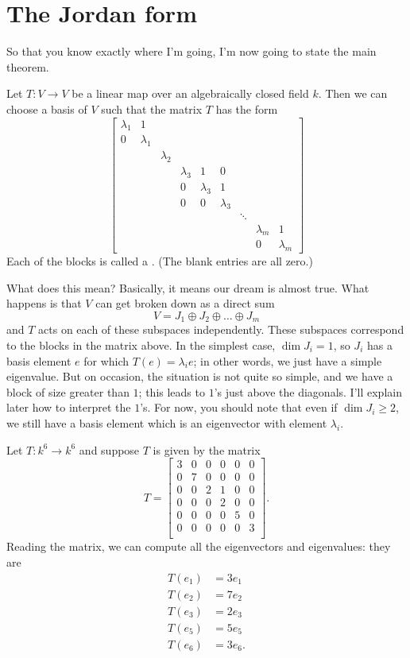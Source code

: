 \section{The Jordan form}
So that you know exactly where I'm going, I'm now going to state the main theorem.
\begin{theorem}
	Let $T : V \to V$ be a linear map over an algebraically closed field $k$.
	Then we can choose a basis of $V$ such that the matrix $T$ has the form
	\[
	\begin{bmatrix}
		\lambda_1 & 1 \\
		0 & \lambda_1 \\
		&& \lambda_2 \\
		&&& \lambda_3 & 1 & 0 \\
		&&& 0 & \lambda_3 & 1 \\
		&&& 0 & 0 & \lambda_3 \\
		&&&&&& \ddots \\
		&&&&&&& \lambda_m & 1 \\
		&&&&&&& 0 & \lambda_m
	\end{bmatrix}
	\]
	Each of the blocks is called a .
	(The blank entries are all zero.)
\end{theorem}
What does this mean?
Basically, it means our dream is almost true.
What happens is that $V$ can get broken down as a direct sum
\[ V = J_1 \oplus J_2 \oplus \dots \oplus J_m \]
and $T$ acts on each of these subspaces independently.
These subspaces correspond to the blocks in the matrix above.
In the simplest case, $\dim J_i = 1$, so $J_i$ has a basis element $e$ for which $T(e) = \lambda_i e$;
in other words, we just have a simple eigenvalue.
But on occasion, the situation is not quite so simple, and we have a block of size greater than $1$;
this leads to $1$'s just above the diagonals.
I'll explain later how to interpret the $1$'s.
For now, you should note that even if $\dim J_i \ge 2$, we still have a basis element
which is an eigenvector with element $\lambda_i$.

\begin{example}
	Let $T : k^6 \to k^6$ and suppose $T$ is given by the matrix
	\[ 
		T = \begin{bmatrix}
			3 & 0 & 0 & 0 & 0 & 0 \\
			0 & 7 & 0 & 0 & 0 & 0 \\
			0 & 0 & 2 & 1 & 0 & 0 \\
			0 & 0 & 0 & 2 & 0 & 0 \\
			0 & 0 & 0 & 0 & 5 & 0 \\
			0 & 0 & 0 & 0 & 0 & 3 \\
		\end{bmatrix}.
	\]
	Reading the matrix, we can compute all the eigenvectors and eigenvalues:
	they are
	\begin{align*}
		T(e_1) &= 3e_1 \\
		T(e_2) &= 7e_2 \\
		T(e_3) &= 2e_3 \\
		T(e_5) &= 5e_5 \\
		T(e_6) &= 3e_6.
	\end{align*}
\end{example}


